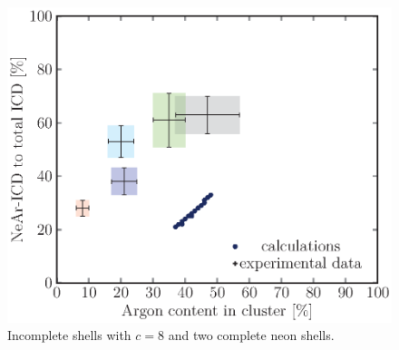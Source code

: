 \begin{figure}[!h]
\begin{minipage}{0.48\textwidth}
    \centering
    \includegraphics[scale=0.5]{pics/incompl02_08.ps}
    \caption{Incomplete shells with $c=8$ and two complete neon shells.}
    \label{incompl01_08_2neon}
\end{minipage}
\hfill
\begin{minipage}{0.48\textwidth}
    \centering
\end{minipage}
\end{figure}

\FloatBarrier

